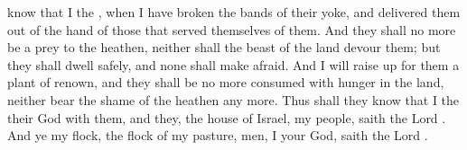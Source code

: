 {know that I
{} the
{}, when I have
broken the
bands of their
yoke, and
delivered them out of the
hand of those that
served themselves of them.
And they shall no more be a
prey to the
heathen, neither shall the
beast of the
land
devour them; but they shall
dwell
safely, and none shall make
{}
afraid.
And I will raise
up for them a
plant of
renown, and they shall be no more
consumed with
hunger in the
land, neither
bear the
shame of the
heathen any more.
Thus shall they
know that I the
{} their
God
{} with them, and
{} they,
{} the
house of
Israel,
{} my
people,
saith the
Lord
{}.
And
ye my
flock, the
flock of my
pasture,
{}
men,
{} I
{} your
God,
saith the
Lord
{}.

}
